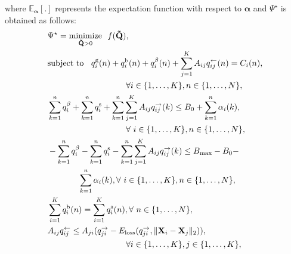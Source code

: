 \documentclass[10pt, letter,twocolumn]{IEEEtran}
\begin{document}
\normalsize
\noindent where $\mathbb{E}_{\boldsymbol{\alpha}}[.]$ represents the expectation function with respect to $\boldsymbol{\alpha}$ and $\Psi^{\star}$ is obtained as follows:
\small
\begin{align}
& \Psi^{\star} = \underset{\mathbf{\tilde{Q}} > 0}{\text{minimize}} \ \ f(\mathbf{\tilde{Q}}), \label{Obj4}\\
& \text{subject to } \;\; q_{i}^{\text{g}}(n) + q_{i}^{\text{b}}(n) + q_{i}^{\beta}(n) + \sum \limits^{K}_{j=1} A_{ij} q^{\leftarrow}_{ij}(n) = C_{i}(n), \notag \\
& \hspace{3.3cm} \forall i \in \{1, \ldots, K \}, n \in \{1,\ldots,N\}, \label{const41}\\
&\sum \limits_{k=1}^{n} q_{i}^{\beta} + \sum \limits_{k=1}^{n} q_{i}^{\text{s}} + \sum \limits_{k=1}^{n}  \sum \limits_{j=1}^{K} A_{ij} q^{\rightarrow}_{ij}(k) \leq B_{0} + \sum \limits_{k=1}^{n} \alpha_{i}(k), \notag \\
& \hspace{3.3cm}\forall \ i \in \{1,\ldots,K\}, n \in \{1, \ldots,N\},   \label{const42}\\
& -\sum \limits_{k=1}^{n} q_{i}^{\beta} -  \sum \limits_{k=1}^{n} q_{i}^{\text{s}} - \sum \limits_{k=1}^{n}  \sum \limits_{j=1}^{K} A_{ij} q^{\rightarrow}_{ij}(k) \leq B_{\max}-B_{0} - \notag \\
& \hspace{1.3cm} \sum \limits_{k=1}^{n} \alpha_{i}(k), \forall \ i \in \{1,\ldots,K\}, n \in \{1, \ldots,N\},\label{const43} \\
& \sum \limits_{i=1}^{K} q_{i}^{\text{b}}(n) = \sum \limits_{i=1}^{K} q_{i}^{\text{s}}(n), \forall \ n \in \{1,\ldots,N\},\label{const44}\\
& A_{ij}q^{\leftarrow}_{ij} \leq  A_{ji}(q^{\rightarrow}_{ji} -  E_{\text{loss}}(q^{\rightarrow}_{ji}, \|\mathbf{X}_{i} - \mathbf{X}_{j}\|_{2}) ), \notag \\
& \hspace{3.3cm}\forall i \in \{1, \ldots,K\},j \in \{1,\ldots,K\} \label{const45},
\end{align}\normalsize
\end{document}

